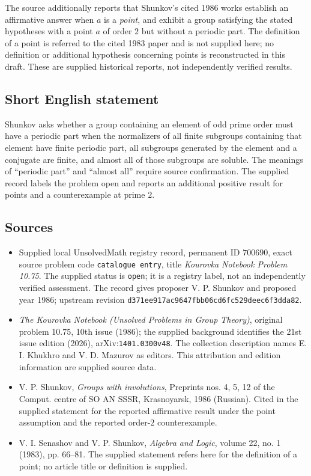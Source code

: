 \documentclass[11pt]{article}
\begin{document}
The source additionally reports that Shunkov's cited 1986 works establish an affirmative answer when \(a\) is a \emph{point}, and exhibit a group satisfying the stated hypotheses with a point \(a\) of order \(2\) but without a periodic part. The definition of a point is referred to the cited 1983 paper and is not supplied here; no definition or additional hypothesis concerning points is reconstructed in this draft. These are supplied historical reports, not independently verified results.
\subsection{Short English statement}
Shunkov asks whether a group containing an element of odd prime order must have a periodic part when the normalizers of all finite subgroups containing that element have finite periodic part, all subgroups generated by the element and a conjugate are finite, and almost all of those subgroups are soluble. The meanings of ``periodic part'' and ``almost all'' require source confirmation. The supplied record labels the problem open and reports an additional positive result for points and a counterexample at prime \(2\).
\subsection{Sources}
\begin{itemize}
\item Supplied local UnsolvedMath registry record, permanent ID \(700690\), exact source problem code \texttt{catalogue entry}, title \emph{Kourovka Notebook Problem 10.75}. The supplied status is \texttt{open}; it is a registry label, not an independently verified assessment. The record gives proposer V. P. Shunkov and proposed year 1986; upstream revision \texttt{d371ee917ac9647fbb06cd6fc529deec6f3dda82}.
\item \emph{The Kourovka Notebook (Unsolved Problems in Group Theory)}, original problem 10.75, 10th issue (1986); the supplied background identifies the 21st issue edition (2026), arXiv:\texttt{1401.0300v48}. The collection description names E. I. Khukhro and V. D. Mazurov as editors. This attribution and edition information are supplied source data.
\item V. P. Shunkov, \emph{Groups with involutions}, Preprints nos. 4, 5, 12 of the Comput. centre of SO AN SSSR, Krasnoyarsk, 1986 (Russian). Cited in the supplied statement for the reported affirmative result under the point assumption and the reported order-\(2\) counterexample.
\item V. I. Senashov and V. P. Shunkov, \emph{Algebra and Logic}, volume 22, no. 1 (1983), pp. 66--81. The supplied statement refers here for the definition of a point; no article title or definition is supplied.
\end{itemize}
\end{document}
